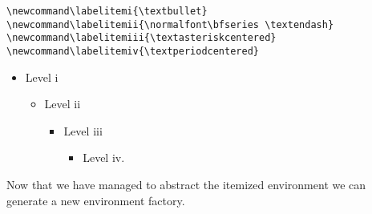 \bigskip
\begin{tcolorbox}[width=\linewidth,arc=2mm,title=Default \LaTeX\ parameters for itemized lists]
\begin{lstlisting}
\newcommand\labelitemi{\textbullet}
\newcommand\labelitemii{\normalfont\bfseries \textendash}
\newcommand\labelitemiii{\textasteriskcentered}
\newcommand\labelitemiv{\textperiodcentered}
\end{lstlisting}
\end{tcolorbox}





\begin{itemize}
\item Level i
      \begin{itemize}
       \item Level ii
          \begin{itemize}
            \item Level iii
              \begin{itemize}
                \item Level iv. \lipsum*[1]
              \end{itemize}
          \end{itemize}
      \end{itemize}
\end{itemize}


Now that we have managed to abstract the itemized environment we can generate a new environment factory.

\def\newitemizedenvironment#1#2{
\expandafter\def\csname#1\endcsname{%
 \cxset{#2}%
 \ifnum \@itemdepth >\thr@@\@toodeep\else
 \advance\@itemdepth\@ne
 \edef\@itemitem{labelitem\romannumeral\the\@itemdepth}%
 \expandafter
 \list
 \csname\@itemitem\endcsname
 {\def\makelabel####1{\hss\llap{####1}}}%
 \fi}
 \expandafter\let\csname end#1\endcsname=\endlist
}

